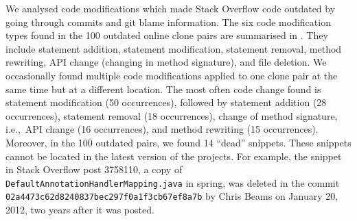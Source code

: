 \documentclass[10pt,journal,compsoc]{IEEEtran}
\begin{document}
We analysed code modifications which made Stack Overflow code outdated by going
through commits and git blame information. The six code modification
types found in the 100 outdated online clone pairs are summarised in
. They include statement addition, statement modification,
statement removal, method rewriting, API change (changing in method signature),
and file deletion. We occasionally found multiple code modifications applied to
one clone pair at the same time but at a different location. The most often code
change found is statement modification (50 occurrences), followed by statement
addition (28 occurrences), statement removal (18 occurrences), change of
method signature, i.e.,~API change (16 occurrences), and method rewriting (15
occurrences). Moreover, in the 100 outdated pairs, we found 14 ``dead''
snippets. These snippets cannot be located in the latest version of the
projects. For example, the snippet in Stack Overflow post 3758110, a copy of
{\small{\texttt{DefaultAnnotationHandlerMapping.java}}} in \textsf{spring}, was
deleted in the commit
{\small{\texttt{02a4473c62d8240837bec297f0a1f3cb67ef8a7b}}} by Chris Beams on
January 20, 2012, two years after it was posted.
\end{document}
